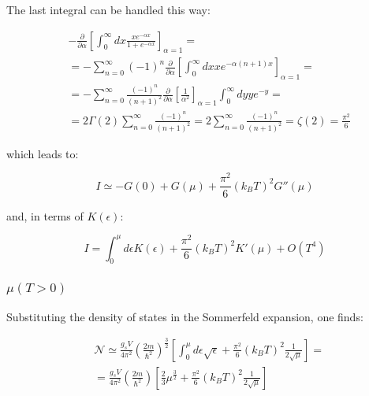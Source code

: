 \documentclass{article}
\begin{document}
The last integral can be handled this way:

\begin{equation}
    \begin{aligned}
         & -\frac{\partial}{\partial \alpha}\left[\int_0^\infty dx \frac{xe^{-\alpha x}}{1+e^{-\alpha x}}\right]_{\alpha=1}=                               \\
         & =-\sum_{n=0}^ \infty (-1)^n\frac{\partial}{\partial \alpha}\left[ \int_0^\infty dx x e^{-\alpha(n+1)x} \right]_{\alpha=1}=                      \\
         & =-\sum_{n=0}^\infty \frac{(-1)^n}{(n+1)^2}\frac{\partial}{\partial \alpha}\left[\frac{1}{\alpha^2} \right]_{\alpha=1}\int_0^\infty dy y e^{-y}= \\
         & = 2\Gamma(2)\sum_{n=0}^\infty \frac{(-1)^n}{(n+1)^2}=2\sum_{n=0}^\infty \frac{(-1)^n}{(n+1)^2}=\zeta(2)=\frac{\pi^2}{6}
    \end{aligned}
\end{equation}

which leads to:

\begin{equation}
    I\simeq -G(0)+G(\mu)+\frac{\pi^2}{6}(k_BT)^2G''(\mu)
\end{equation}

and, in terms of $K(\epsilon)$:

\begin{equation}
    I=\int_0^\mu d\epsilon K(\epsilon)+\frac{\pi^2}{6}(k_BT)^2K'(\mu)+O(T^4)
\end{equation}

\subsubsection{$\mu(T>0)$}

Substituting the density of states in the Sommerfeld expansion, one finds:

\begin{equation}
    \begin{aligned}
         & \mathcal{N}\simeq \frac{g_sV}{4\pi^2}\left(\frac{2m}{\hbar^2}\right)^{\frac{3}{2}}\left[\int_0^\mu d\epsilon \sqrt{\epsilon}+\frac{\pi^2}{6}(k_BT)^2\frac{1}{2\sqrt{\mu}}\right]= \\
         & =\frac{g_s V}{4\pi^2}\left(\frac{2m}{\hbar^2}\right)\left[\frac{2}{3}\mu^{\frac{3}{2}}+\frac{\pi^2}{6}(k_BT)^2\frac{1}{2\sqrt{\mu}}\right]
    \end{aligned}
\end{equation}
\end{document}
